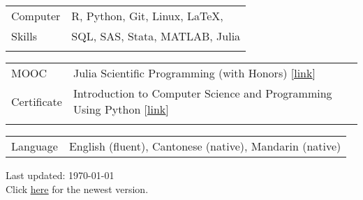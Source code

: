 \documentclass[letterpaper, 11pt]{article}
\begin{document}
\noindent \begin{tabular}{@{} p{3cm} l}
	\Large{Computer}  & R, Python, Git, Linux, \LaTeX,   \\
	\Large{Skills}    & SQL, SAS, Stata, MATLAB, Julia \\
	& \\
\end{tabular}





\noindent \begin{tabular}{@{} p{3cm} p{15cm} }
	\Large{MOOC}      & Julia Scientific Programming (with Honors) [\href{https://www.coursera.org/account/accomplishments/certificate/X8AH3BM8MML6}{\underline{link}}]   \\
	\Large{Certificate} & Introduction to Computer Science and Programming Using Python [\href{https://s3.amazonaws.com/verify.edx.org/downloads/7444184db6054c2e8404972c595b5ebf/Certificate.pdf}{\underline{link}}] \\
	\\
\end{tabular}





\noindent \begin{tabular}{@{} p{3cm} l}
	\Large{Language}  & English (fluent), Cantonese (native), Mandarin (native)   \\
\end{tabular}





\vspace{1cm}

\begin{center}
  \begin{footnotesize}
    Last updated: \today \\
    Click \href{https://jiachenghe.github.io/files/cv/CV.pdf}{\underline{here}} for the newest version.
  \end{footnotesize}
\end{center}
\end{document}
